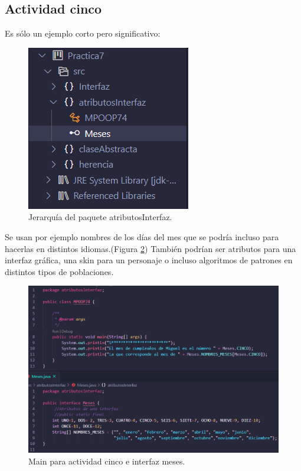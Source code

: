 \documentclass[conference]{IEEEtran}
\begin{document}
        \subsection{Actividad cinco}

            Es sólo un ejemplo corto pero significativo:

            \begin{figure}[htbp]
                \centerline{\includegraphics[scale=0.6]{./pics/11}}
                \caption{Jerarquía del paquete atributosInterfaz.}
                \label{fig11}
            \end{figure}

            Se usan por ejemplo nombres de los días del mes que se podría incluso para hacerlas en distintos idiomas.(Figura \ref{fig12})
            También podrían ser atributos para una interfaz gráfica, una skin para un personaje o incluso algoritmos de patrones en distintos tipos de poblaciones.
            \begin{figure}[htbp]
                \centerline{\includegraphics[scale=0.3]{./pics/15}}
                \caption{Main para actividad cinco e interfaz meses.}
                \label{fig12}
            \end{figure}
\end{document}
